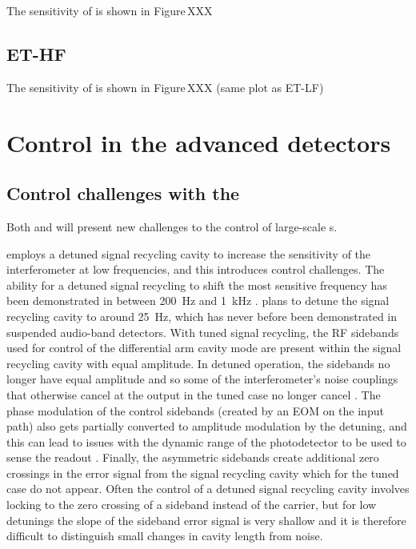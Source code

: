 The sensitivity of \ETLF{} is shown in Figure\,XXX

\subsection{ET-HF}

The sensitivity of \ETHF{} is shown in Figure\,XXX (same plot as ET-LF)

\section{Control in the advanced detectors}



\subsection{\label{sec:et-lf-control-challenges}Control challenges with the \ET{}}
Both \ETLF{} and \ETHF{} will present new challenges to the control of large-scale \DRFPMI{}s.

\ETLF{} employs a detuned signal recycling cavity to increase the sensitivity of the interferometer at low frequencies, and this introduces control challenges. The ability for a detuned signal recycling to shift the most sensitive frequency has been demonstrated in \GEO{} between \SI{200}{\hertz} and \SI{1}{\kilo\hertz} \cite{Hild2006}. \ETLF{} plans to detune the signal recycling cavity to around \SI{25}{\hertz}, which has never before been demonstrated in suspended audio-band detectors. With tuned signal recycling, the \gls{RF} sidebands used for control of the differential arm cavity mode are present within the signal recycling cavity with equal amplitude. In detuned operation, the sidebands no longer have equal amplitude and so some of the interferometer's noise couplings that otherwise cancel at the output in the tuned case no longer cancel \cite{Hild2007}. The phase modulation of the control sidebands (created by an \gls{EOM} on the input path) also gets partially converted to amplitude modulation by the detuning, and this can lead to issues with the dynamic range of the photodetector to be used to sense the readout \cite{Grote2007}. Finally, the asymmetric sidebands create additional zero crossings in the error signal from the signal recycling cavity which for the tuned case do not appear. Often the control of a detuned signal recycling cavity involves locking to the zero crossing of a sideband instead of the carrier, but for low detunings the slope of the sideband error signal is very shallow and it is therefore difficult to distinguish small changes in cavity length from noise.

